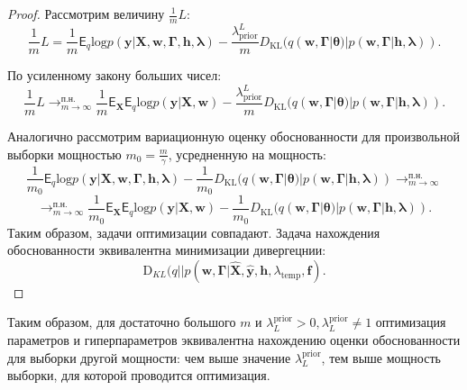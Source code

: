 \begin{proof}
Рассмотрим величину  $\frac{1}{m}L$: \\
\[
    \frac{1}{m}L = \frac{1}{m}\mathsf{E}_q \text{log}p(\mathbf{y}|\mathbf{X},  \mathbf{w}, \boldsymbol{\Gamma}, \mathbf{h}, \boldsymbol{\lambda}) - \frac{\lambda_\text{prior}^L}{m}D_\text{KL}(q(\mathbf{w}, \boldsymbol{\Gamma}|\boldsymbol{\theta})|p(\mathbf{w},\boldsymbol{\Gamma}|\mathbf{h}, \boldsymbol{\lambda})).
\]

По усиленному закону больших чисел: 
\[
    \frac{1}{m}L \to_{m \to \infty}^{\text{п.н.}} \frac{1}{m}\mathsf{E}_\mathbf{X}\mathsf{E}_{q} \text{log}p(\mathbf{y}|\mathbf{X}, \mathbf{w}) -\frac{\lambda_\text{prior}^L}{m}D_\text{KL}(q(\mathbf{w}, \boldsymbol{\Gamma}|\boldsymbol{\theta})|p(\mathbf{w},\boldsymbol{\Gamma}|\mathbf{h}, \boldsymbol{\lambda})).
\]

Аналогично рассмотрим вариационную оценку обоснованности для произвольной выборки мощностью $m_0 = \frac{m}{\gamma}$, усредненную на мощность:
\[
    \frac{1}{m_0}\mathsf{E}_q \text{log}p(\mathbf{y}|\mathbf{X},  \mathbf{w}, \boldsymbol{\Gamma}, \mathbf{h}, \boldsymbol{\lambda}) - \frac{1}{m_0}D_\text{KL}(q(\mathbf{w}, \boldsymbol{\Gamma}|\boldsymbol{\theta})|p(\mathbf{w},\boldsymbol{\Gamma}|\mathbf{h}, \boldsymbol{\lambda})) \to_{m \to \infty}^{\text{п.н.}}
\]
\[
\to_{m \to \infty}^{\text{п.н.}} \frac{1}{m_0}\mathsf{E}_\mathbf{X}\mathsf{E}_{q} \text{log}p(\mathbf{y}|\mathbf{X}, \mathbf{w}) -\frac{1}{m_0}D_\text{KL}(q(\mathbf{w}, \boldsymbol{\Gamma}|\boldsymbol{\theta})|p(\mathbf{w},\boldsymbol{\Gamma}|\mathbf{h}, \boldsymbol{\lambda})).
\]
Таким образом, задачи оптимизации совпадают. Задача нахождения обоснованности эквивалентна минимизации дивергецнии:
\[
\text{D}_{KL}(q||p(\mathbf{w}, \boldsymbol{\Gamma} | \hat{\mathbf{X}}, \hat{\mathbf{y}},\mathbf{h},\lambda_{\text{temp}},\mathbf{f}).
\]

\end{proof}
Таким образом, для достаточно большого $m$ и $\lambda^{\text{prior}}_L>0, \lambda^{\text{prior}}_L \neq 1$ оптимизация параметров и гиперпараметров эквивалентна нахождению оценки обоснованности для выборки другой мощности: чем выше значение $ \lambda^{\text{prior}}_L$, тем выше мощность выборки, для которой проводится оптимизация.

